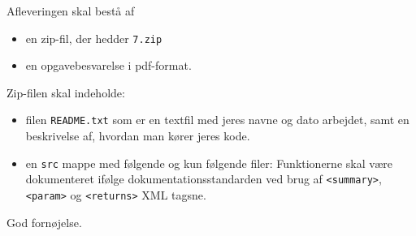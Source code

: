 \documentclass[a4paper,12pt]{article}
\newcommand{\exerciseNumber}{7}
\begin{document}
Afleveringen skal bestå af
\begin{itemize}
  \item en zip-fil, der hedder \texttt{\exerciseNumber\typeLetter.zip}
  \item en opgavebesvarelse i pdf-format.
\end{itemize}
Zip-filen skal indeholde:
\begin{itemize}
\item filen \texttt{README.txt} som er en textfil med jeres navne og dato arbejdet, samt en beskrivelse af, hvordan man kører jeres kode.
\item en \texttt{src} mappe med følgende og kun
  følgende filer:
  Funktionerne skal være dokumenteret ifølge dokumentationsstandarden ved brug af \verb|<summary>|, \verb|<param>| og \verb|<returns>| XML tagsne.
\end{itemize}

\flushright God fornøjelse.
\end{document}

